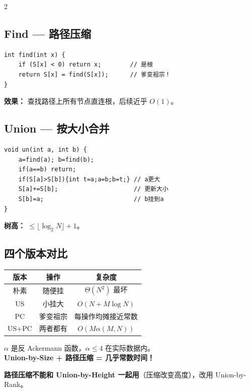 \documentclass[10pt,a4paper]{article}
\begin{document}
\begin{multicols}{2}

\subsection*{Find — 路径压缩}

\begin{lstlisting}
int find(int x) {
    if (S[x] < 0) return x;        // 是根
    return S[x] = find(S[x]);      // 爹变祖宗！
}
\end{lstlisting}

\textbf{效果：} 查找路径上所有节点直连根，后续近乎 $O(1)$。

\subsection*{Union — 按大小合并}

\begin{lstlisting}
void un(int a, int b) {
    a=find(a); b=find(b);
    if(a==b) return;
    if(S[a]>S[b]){int t=a;a=b;b=t;} // a更大
    S[a]+=S[b];                     // 更新大小
    S[b]=a;                         // b挂到a
}
\end{lstlisting}

\textbf{树高：} $\le \lfloor\log_2 N\rfloor + 1$。

\columnbreak

\subsection*{四个版本对比}

\begin{tabular}{|c|c|c|}
\hline
\textbf{版本} & \textbf{操作} & \textbf{复杂度} \\
\hline
朴素 & 随便挂 & $\Theta(N^2)$ 最坏 \\
US & 小挂大 & $O(N+M\log N)$ \\
PC & 爹变祖宗 & 每操作均摊接近常数 \\
US+PC & 两者都有 & $O(M\alpha(M,N))$ \\
\hline
\end{tabular}

\begin{keybox}
$\alpha$ 是反 Ackermann 函数，$\alpha\le 4$ 在实际数据内。\\
\textbf{Union-by-Size + 路径压缩 = 几乎常数时间！}

\textbf{路径压缩不能和 Union-by-Height 一起用}（压缩改变高度），改用 Union-by-Rank。
\end{keybox}


\end{multicols}
\end{document}
